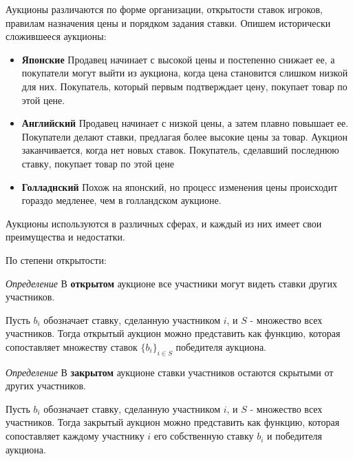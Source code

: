 Аукционы различаются по форме организации, открытости ставок игроков, правилам назначения цены и порядком задания ставки.
Опишем исторически сложившееся аукционы: 
\begin{itemize}
    \item \textbf{Японские} Продавец начинает с высокой цены и постепенно снижает ее, а покупатели могут выйти из аукциона, когда цена становится слишком низкой для них. Покупатель, который первым подтверждает цену, покупает товар по этой цене.
    \item \textbf{Английский} Продавец начинает с низкой цены, а затем плавно повышает ее. Покупатели делают ставки, предлагая более высокие цены за товар. Аукцион заканчивается, когда нет новых ставок. Покупатель, сделавший последнюю ставку, покупает товар по этой цене
    \item \textbf{Голладнский} Похож на японский, но процесс изменения цены происходит гораздо медленее, чем в голландском аукционе.
\end{itemize}

Аукционы используются в различных сферах, и каждый из них имеет свои преимущества и недостатки. 

По степени открытости:

\textit{Определение} В \textbf{открытом} аукционе все участники могут видеть ставки других участников.

Пусть \( b_i \) обозначает ставку, сделанную участником \( i \), и \( S \) - множество всех участников. Тогда открытый аукцион можно представить как функцию, которая сопоставляет множеству ставок \( \{b_i\}_{i \in S} \) победителя аукциона.

\textit{Определение} В \textbf{закрытом} аукционе ставки участников остаются скрытыми от других участников.
 
 Пусть \( b_i \) обозначает ставку, сделанную участником \( i \), и \( S \) - множество всех участников. Тогда закрытый аукцион можно представить как функцию, которая сопоставляет каждому участнику \( i \) его собственную ставку \( b_i \) и победителя аукциона.
